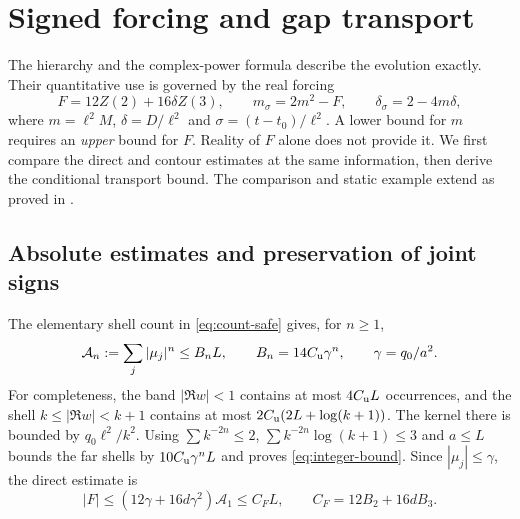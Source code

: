 \section{Signed forcing and gap transport}
\label{sec:bounds}

The hierarchy and the complex-power formula describe the evolution
exactly. Their quantitative use is governed by the real forcing
\begin{equation}
 F=12Z(2)+16\delta Z(3),\qquad
 m_\sigma=2m^2-F,\qquad \delta_\sigma=2-4m\delta,
 \label{eq:consumer-system}
\end{equation}
where $m=\ell^2M$, $\delta=D/\ell^2$ and
$\sigma=(t-t_0)/\ell^2$. A lower bound for $m$ requires an
\emph{upper} bound for $F$. Reality of $F$ alone does not provide it.
We first compare the direct and contour estimates at the same information,
then derive the conditional transport bound. The comparison and static
example extend \cite{BakerGR05} as proved in \cite{BakerCM06}.

\subsection{Absolute estimates and preservation of joint signs}

The elementary shell count in \eqref{eq:count-safe} gives, for $n\ge1$,
\begin{equation}
 \mathcal A_n:=\sum_j|\mu_j|^n\le B_nL,
 \qquad B_n=14C_{\mathrm u}\gamma^n,\qquad \gamma=q_0/a^2.
 \label{eq:integer-bound}
\end{equation}
For completeness, the band $|\Re w|<1$ contains at most $4C_{\mathrm u} L$
occurrences, and the shell $k\le|\Re w|<k+1$ contains at most
$2C_{\mathrm u}(2L+\log(k+1))$. The kernel there is bounded by
$q_0\ell^2/k^2$. Using
$\sum k^{-2n}\le2$, $\sum k^{-2n}\log(k+1)\le3$ and $a\le L$
bounds the far shells by $10C_{\mathrm u}\gamma^nL$ and proves
\eqref{eq:integer-bound}.
Since $|\mu_j|\le\gamma$, the direct estimate is
\begin{equation}
 |F|\le (12\gamma+16d\gamma^2)\mathcal A_1\le C_FL,
 \qquad C_F=12B_2+16dB_3.
 \label{eq:direct-forcing}
\end{equation}

